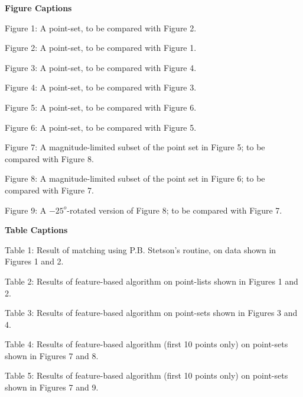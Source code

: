\parindent 0pt

\newpage 
{\bf Figure Captions}

\bigskip

\bigskip

\bigskip

Figure 1: A point-set, to be compared with Figure 2.

\bigskip

Figure 2: A point-set, to be compared with Figure 1.

\bigskip

Figure 3: A point-set, to be compared with Figure 4.

\bigskip

Figure 4: A point-set, to be compared with Figure 3.

\bigskip

Figure 5: A point-set, to be compared with Figure 6.

\bigskip

Figure 6: A point-set, to be compared with Figure 5.

\bigskip

Figure 7: A magnitude-limited subset of the point set in Figure 5; to be compared
with Figure 8.

\bigskip

Figure 8: A magnitude-limited subset of the point set in Figure 6; to be 
compared with Figure 7.

\bigskip

Figure 9: A $-25^o$-rotated version of Figure 8; to be compared with Figure 7.
 
\newpage

{\bf Table Captions}

\bigskip

\bigskip

\bigskip

Table 1: Result of matching using P.B. Stetson's routine, on data shown in
Figures 1 and 2.

\bigskip

Table 2: Results of feature-based algorithm on point-lists shown in Figures 1
and 2. 

\bigskip

Table 3: Results of feature-based algorithm on point-sets shown in Figures 3 
and 4. 

\bigskip

Table 4: Results of feature-based algorithm (first 10 points only) 
on point-sets shown in Figures 7 and
8.

\bigskip

Table 5: Results of feature-based algorithm (first 10 points only) 
on point-sets shown in Figures 7 and
9.



\bye

